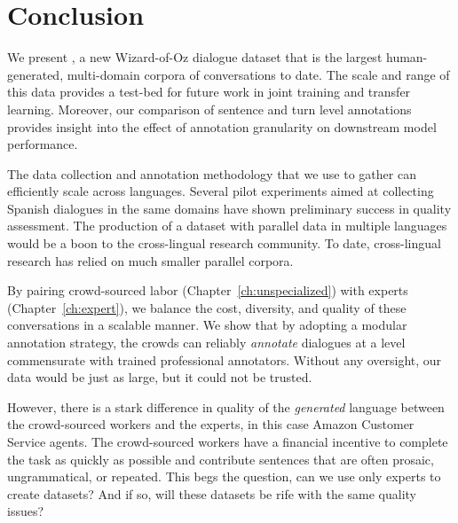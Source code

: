 



\section{Conclusion}



We present \multidogo, a new Wizard-of-Oz dialogue dataset that is the largest human-generated, multi-domain corpora of conversations to date.  
%
The scale and range of this data provides a test-bed for future work in joint training and transfer learning.  
%
Moreover, our comparison of sentence and turn level annotations provides insight into the effect of annotation granularity on downstream model performance.

The data collection and annotation methodology that we use to gather \multidogo can efficiently scale across languages.  
%
Several pilot experiments aimed at collecting Spanish dialogues in the same domains have shown preliminary success in quality assessment. 
%
The production of a  dataset with parallel data in multiple languages would be a boon to the cross-lingual research community. 
%
To date, cross-lingual  research \citep{upadhyay2018almost, schuster2018cross} has relied on much smaller parallel corpora. 

By pairing crowd-sourced labor (Chapter~\ref{ch:unspecialized}) with experts (Chapter~\ref{ch:expert}), we balance the cost, diversity, and quality of these conversations in a scalable manner. 
%
We show that by adopting a modular annotation strategy, the crowds can reliably \textit{annotate} dialogues at a level commensurate with trained professional annotators. 
%
Without any oversight, our data would be just as large, but it could not be trusted.  

 However, there is a stark difference in quality of the \textit{generated} language between the crowd-sourced workers and the experts, in this case Amazon Customer Service agents.  
 The crowd-sourced workers have a financial incentive to complete the task as quickly as possible and contribute sentences that are often prosaic, ungrammatical, or repeated.  
 This begs the question, can we use only experts to create datasets?  And if so, will these datasets be rife with the same quality issues? 